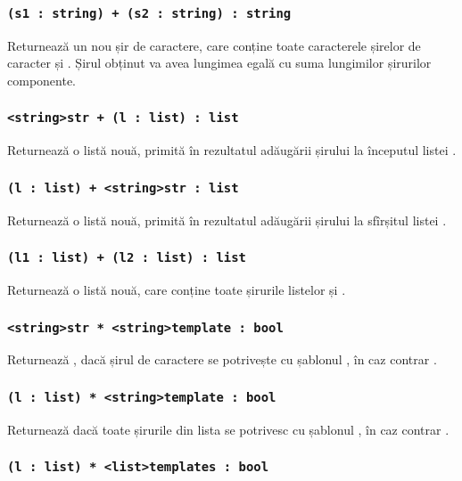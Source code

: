 \subsubsection{\lstinline|(s1 : string) + (s2 : string) : string|}

Returnează un nou șir de caractere, care conține toate caracterele șirelor de caracter  și . Șirul obținut va avea lungimea egală cu suma lungimilor șirurilor componente.

\subsubsection{\lstinline|<string>str + (l : list) : list|}

Returnează o listă nouă, primită în rezultatul adăugării șirului  la începutul listei .

\subsubsection{\lstinline|(l : list) + <string>str : list|}

Returnează o listă nouă, primită în rezultatul adăugării șirului  la sfîrșitul listei .

\subsubsection{\lstinline|(l1 : list) + (l2 : list) : list|}

Returnează o listă nouă, care conține toate șirurile listelor  și .

\subsubsection{\lstinline|<string>str * <string>template : bool|}

Returnează \true{}, dacă șirul de caractere  se potrivește cu șablonul , în caz contrar \false{}.

\subsubsection{\lstinline|(l : list) * <string>template : bool|}

Returnează \true{} dacă toate șirurile din lista  se potrivesc cu șablonul , în caz contrar \false{}.

\subsubsection{\lstinline|(l : list) * <list>templates : bool|}

